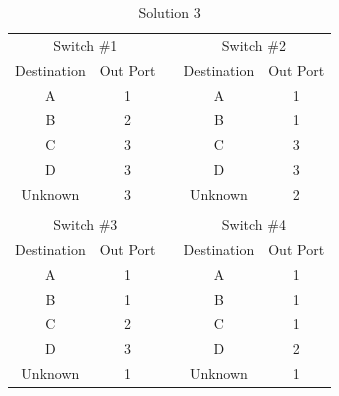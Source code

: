 \documentclass[12pt,addpoints,answers]{exam}
\begin{document}
\begin{questions}
\begin{table}[]
	\centering
	\caption{Solution 3}
	\label{Table 1}
	\begin{tabular}{|c|c|c|c|c|}
		\cline{1-2} \cline{4-5}
		\multicolumn{2}{|c|}{Switch \#1} & \multirow{7}{*}{} & \multicolumn{2}{c|}{Switch \#2} \\ \cline{1-2} \cline{4-5} 
		Destination      & Out Port      &                   & Destination      & Out Port     \\ \cline{1-2} \cline{4-5} 
		A                & 1             &                   & A                & 1            \\
		B                & 2             &                   & B                & 1            \\
		C                & 3             &                   & C                & 3            \\
		D                & 3             &                   & D                & 3            \\
		Unknown          & 3             &                   & Unknown          & 2            \\
		\multicolumn{5}{|c|}{}                                                                 \\ \cline{1-2} \cline{4-5} 
		\multicolumn{2}{|c|}{Switch \#3} & \multirow{7}{*}{} & \multicolumn{2}{c|}{Switch \#4} \\ \cline{1-2} \cline{4-5} 
		Destination      & Out Port      &                   & Destination      & Out Port     \\ \cline{1-2} \cline{4-5} 
		A                & 1             &                   & A                & 1            \\
		B                & 1             &                   & B                & 1            \\
		C                & 2             &                   & C                & 1            \\
		D                & 3             &                   & D                & 2            \\
		Unknown          & 1             &                   & Unknown          & 1           
	\end{tabular}
\end{table}


\newpage


\end{questions}
\end{document}
